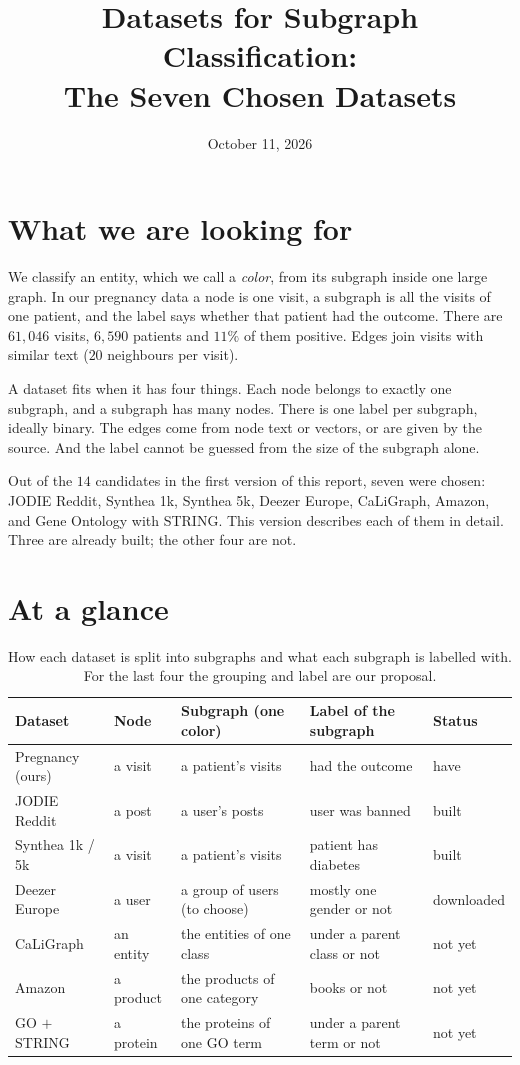 \documentclass[11pt]{article}
\title{Datasets for Subgraph Classification:\\ The Seven Chosen Datasets}
\author{}
\date{October 11, 2026}
\begin{document}
\maketitle

\section*{What we are looking for}

We classify an entity, which we call a \emph{color}, from its subgraph inside one large
graph. In our pregnancy data a node is one visit, a subgraph is all the visits of one patient,
and the label says whether that patient had the outcome. There are $61{,}046$ visits, $6{,}590$
patients and $11\%$ of them positive. Edges join visits with similar text ($20$ neighbours per
visit).

A dataset fits when it has four things. Each node belongs to exactly one subgraph, and a
subgraph has many nodes. There is one label per subgraph, ideally binary. The edges come from
node text or vectors, or are given by the source. And the label cannot be guessed from the size
of the subgraph alone.

Out of the $14$ candidates in the first version of this report, seven were chosen: JODIE
Reddit, Synthea 1k, Synthea 5k, Deezer Europe, CaLiGraph, Amazon, and Gene Ontology with STRING.
This version describes each of them in detail. Three are already built; the other four are not.

\section*{At a glance}

\begin{table}[H]
\centering
\small
\begin{tabularx}{\textwidth}{lXXXl}
\toprule
Dataset & Node & Subgraph (one color) & Label of the subgraph & Status \\
\midrule
Pregnancy (ours) & a visit & a patient's visits & had the outcome & have \\
\addlinespace
JODIE Reddit & a post & a user's posts & user was banned & built \\
Synthea 1k / 5k & a visit & a patient's visits & patient has diabetes & built \\
Deezer Europe & a user & a group of users (to choose) & mostly one gender or not & downloaded \\
CaLiGraph & an entity & the entities of one class & under a parent class or not & not yet \\
Amazon & a product & the products of one category & books or not & not yet \\
GO $+$ STRING & a protein & the proteins of one GO term & under a parent term or not & not yet \\
\bottomrule
\end{tabularx}
\caption{How each dataset is split into subgraphs and what each subgraph is labelled with.
For the last four the grouping and label are our proposal.}
\end{table}
\end{document}
